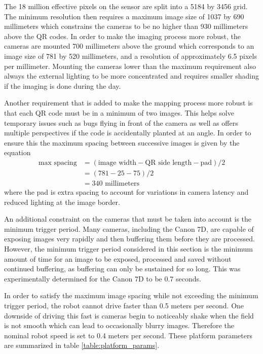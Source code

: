 The 18 million effective pixels on the sensor are split into a 5184 by 3456 grid.  The minimum resolution then requires a maximum image size of 1037 by 690 millimeters which constrains the cameras to be no higher than 930 millimeters above the QR codes.  In order to make the imaging process more robust, the cameras are mounted 700 millimeters above the ground which corresponds to an image size of 781 by 520 millimeters, and a resolution of approximately 6.5 pixels per millimeter.  Mounting the cameras lower than the maximum requirement also always the external lighting to be more concentrated and requires smaller shading if the imaging is done during the day.  

Another requirement that is added to make the mapping process more robust is that each QR code must be in a minimum of two images.  This helps solve temporary issues such as bugs flying in front of the camera as well as offers multiple perspectives if the code is accidentally planted at an angle.  In order to ensure this the maximum spacing between successive images is given by the equation
\begin{align*}
 \text{max spacing} &= (\text{image width} - \text{QR side length} - \text{pad}) / 2 \\
             &= (781 - 25 - 75) / 2 \\ 
             &= 340 \text{ millimeters}
\end{align*}
where the pad is extra spacing to account for variations in camera latency and reduced lighting at the image border.
  
An additional constraint on the cameras that must be taken into account is the minimum trigger period.  Many cameras, including the Canon 7D, are capable of exposing images very rapidly and then buffering them before they are processed.  However, the minimum trigger period considered in this section is the minimum amount of time for an image to be exposed, processed and saved without continued buffering, as buffering can only be sustained for so long.  This was experimentally determined for the Canon 7D to be 0.7 seconds.  

In order to satisfy the maximum image spacing while not exceeding the minimum trigger period, the robot cannot drive faster than 0.5 meters per second.  One downside of driving this fast is cameras begin to noticeably shake when the field is not smooth which can lead to occasionally blurry images.  Therefore the nominal robot speed is set to 0.4 meters per second.  These platform parameters are summarized in table \ref{table:platform_params}.


